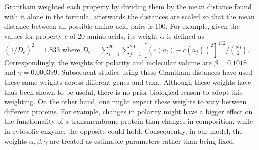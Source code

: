 \documentclass[13pt]{article}
\begin{document}
Grantham weighted each property by dividing them by the mean distance found with it alone in the formula, afterwards the distances are scaled so that the mean distance between all possible amino acid pairs is 100.
For example, given the values for property $c$ of 20 amino acids, its weight $\alpha$ is defined as $(1/\bar{D}_c)^2 = 1.833$ where $\bar{D}_c = \sum_{i=1}^{20}  \sum_{j=1}^{20}[(c\left(a_i\right) - c\left(a_j\right))^2]^{1/2}/\binom{20}{2}$.
Correspondingly, the weights for polarity and molecular volume are $\beta = 0.1018$ and $\gamma = 0.000399$. 
Subsequent studies using these Grantham distances have used these same weights across different genes and taxa. 
Although these weights have thus been shown to be useful, there is no prior biological reason to adopt this weighting. 
On the other hand, one might expect these weights to vary between different proteins. 
For example, changes in polarity might have a bigger effect on the functionality of a transmembrane protein than changes in composition, while in cytosolic enzyme, the opposite could hold. 
Consequently, in our model, the weights $\alpha, \beta, \gamma$ are treated as estimable parameters rather than being fixed. 
\end{document}
